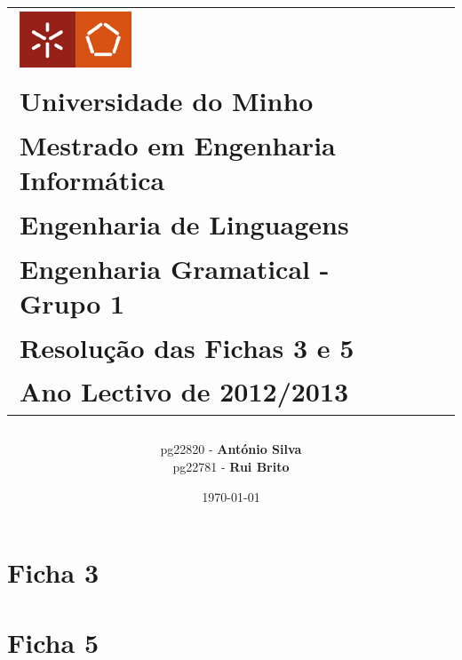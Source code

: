 \documentclass[a4paper,11pt,openright,openbib]{article}
\title{
\begin{center}
	\begin{tabular}{l c r}
	\large{\includegraphics[width=0.3\textwidth]{UM}}&\\
	\large{Universidade do Minho} &\\
	\large{Mestrado em Engenharia Informática} & \\
	\large{Engenharia de Linguagens} & \\
	\large{Engenharia Gramatical - Grupo 1} & \\	
	\large{\textbf{Resolução das Fichas 3 e 5}} & \\
	\large{Ano Lectivo de 2012/2013} & \\
	\end{tabular}
	\end{center}
}
\author{	
	\begin{tabular}[t]{l c r}      
        pg22820 - \textbf{António Silva} \\        
		pg22781 - \textbf{Rui Brito} \\   				
	\\ 
	\end{tabular}
}
\date{\today}
\begin{document}
\maketitle


\pagestyle{headings}
\newpage
\tableofcontents
\newpage

\section{Ficha 3} %
\label{sec:ficha_3}


\section{Ficha 5} %
\label{sec:ficha_5}

\end{document}

